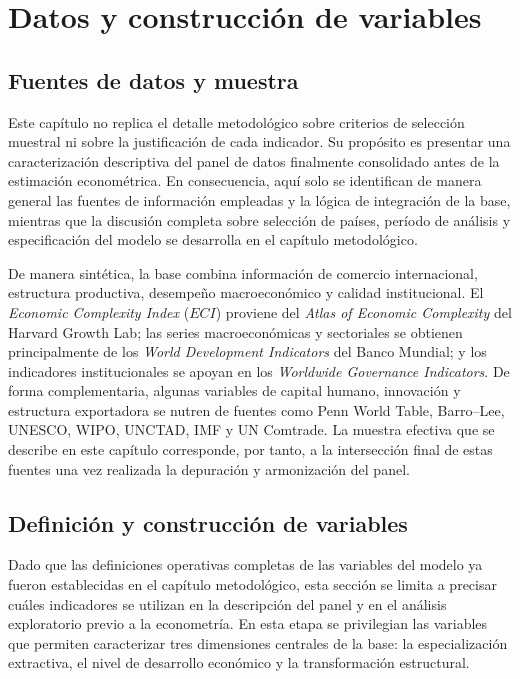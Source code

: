 \documentclass[../../PTFM.tex]{subfiles}
\begin{document}

	\chapter{Datos y construcción de variables}
	\label{chap:datos-variables}

	\section{Fuentes de datos y muestra}
	\label{sec:fuentes-datos-muestra}

	Este capítulo no replica el detalle metodológico sobre criterios de selección muestral ni sobre la justificación de cada indicador. Su propósito es presentar una caracterización descriptiva del panel de datos finalmente consolidado antes de la estimación econométrica. En consecuencia, aquí solo se identifican de manera general las fuentes de información empleadas y la lógica de integración de la base, mientras que la discusión completa sobre selección de países, período de análisis y especificación del modelo se desarrolla en el capítulo metodológico.

	De manera sintética, la base combina información de comercio internacional, estructura productiva, desempeño macroeconómico y calidad institucional. El \textit{Economic Complexity Index} ($ECI$) proviene del \textit{Atlas of Economic Complexity} del Harvard Growth Lab; las series macroeconómicas y sectoriales se obtienen principalmente de los \textit{World Development Indicators} del Banco Mundial; y los indicadores institucionales se apoyan en los \textit{Worldwide Governance Indicators}. De forma complementaria, algunas variables de capital humano, innovación y estructura exportadora se nutren de fuentes como Penn World Table, Barro--Lee, UNESCO, WIPO, UNCTAD, IMF y UN Comtrade. La muestra efectiva que se describe en este capítulo corresponde, por tanto, a la intersección final de estas fuentes una vez realizada la depuración y armonización del panel.


	\section{Definición y construcción de variables}
	\label{sec:definicion-construccion-variables}

	Dado que las definiciones operativas completas de las variables del modelo ya fueron establecidas en el capítulo metodológico, esta sección se limita a precisar cuáles indicadores se utilizan en la descripción del panel y en el análisis exploratorio previo a la econometría. En esta etapa se privilegian las variables que permiten caracterizar tres dimensiones centrales de la base: la especialización extractiva, el nivel de desarrollo económico y la transformación estructural.
\end{document}
